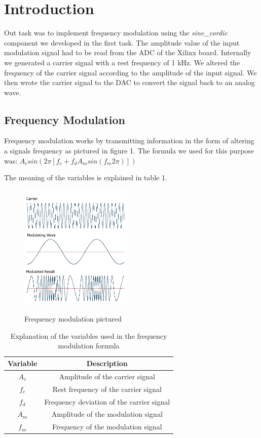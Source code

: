 \section{Introduction}
Out task was to implement frequency modulation using the \textit{sine\_cordic} component we developed in the first task. The amplitude value of the input modulation signal had to be read from the ADC of the Xilinx board. Internally we generated a carrier signal with a rest frequency of 1 kHz. We altered the frequency of the carrier signal according to the amplitude of the input signal. We then wrote the carrier signal to the DAC to convert the signal back to an analog wave. 


\subsection{Frequency Modulation}

Frequency modulation works by transmitting information in the form of altering a signals frequency as pictured in figure 1. The formula we used for this purpose was: $A_csin(2\pi[f_c+f_dA_msin(f_m2\pi)])$

The meaning of the variables is explained in table 1.

\begin{figure}[H] 
\centering %
{\includegraphics[height=6cm]{images/freq_mod.png}} %
\caption{Frequency modulation pictured} 
\label{fig:lorem} %
\end{figure} 

\begin{table}[H] 
	\begin{center}
		\begin{tabular}{ | c | c | }
			\hline
			\textbf{Variable} & \textbf{Description} \\
			\hline
			$A_c$ & Amplitude of the carrier signal \\
			$f_c$ & Rest frequency of the carrier signal \\
			$f_d$ & Frequency deviation of the carrier signal \\
			$A_m$ & Amplitude of the modulation signal \\
			$f_m$ & Frequency of the modulation signal \\
			\hline
		\end{tabular} 
	\end{center}	
	\caption{Explanation of the variables used in the frequency modulation formula} 
\end{table} 
	


